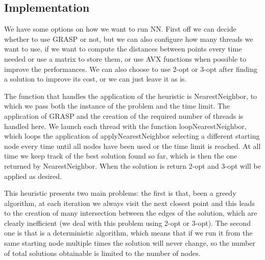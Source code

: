 \subsection{Implementation}
We have some options on how we want to run NN. First off we can decide whether to use GRASP or not, but we can also configure 
how many threads we want to use, if we want to compute the distances between points every time needed or use a matrix to store 
them, or use AVX functions when possible to improve the performances. We can also choose to use 2-opt or 3-opt after finding a 
solution to improve its cost, or we can just leave it as is.


The function that handles the application of the heuristic is NearestNeighbor, to which we pass both the instance of the 
problem and the time limit. The application of GRASP and the creation of the required number of threads is handled here.
We launch each thread with the function loopNearestNeighbor, which loops the application of applyNearestNeighbor selecting 
a different starting node every time until all nodes have been used or the time limit is reached.
At all time we keep track of the best solution found so far, which is then the one returned by NearestNeighbor. When the 
solution is return 2-opt and 3-opt will be applied as desired.

This heuristic presents two main problems: the first is that, been a greedy algorithm, at each iteration we always visit 
the next closest point and this leads to the creation of many intersection between the edges of the solution, which are 
clearly inefficient (we deal with this problem using 2-opt or 3-opt). The second one is that is a deterministic algorithm, 
which means that if we run it from the same starting node multiple times the solution will never change, so the number 
of total solutions obtainable is limited to the number of nodes.

